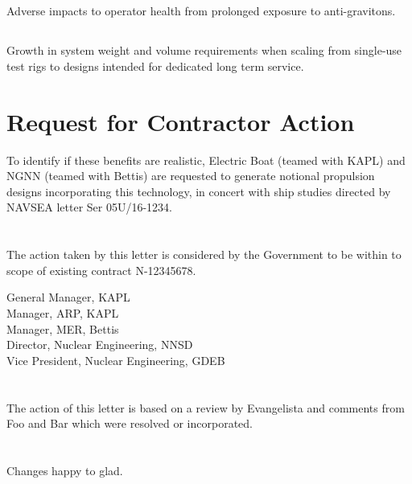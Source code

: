 \documentclass[12pt,courier]{navyletter}
\begin{document}
\subsection{} Adverse impacts to operator health from prolonged exposure to anti-gravitons.

\subsection{} Growth in system weight and volume requirements when scaling from single-use test rigs to designs intended for dedicated long term service. 

\section{Request for Contractor Action} To identify if these benefits are realistic, Electric Boat (teamed with KAPL) and NGNN (teamed with Bettis) are requested to generate notional propulsion designs incorporating this technology, in concert with ship studies directed by NAVSEA letter Ser 05U/16-1234.  

\section{} The action taken by this letter is considered by the Government to be within to scope of existing contract N-12345678. 

\noclosing{}
\signspace{}
\signature{I P Freely}
\bydirection

\copyto
General Manager, KAPL\\
Manager, ARP, KAPL\\
Manager, MER, Bettis\\
Director, Nuclear Engineering, NNSD\\
Vice President, Nuclear Engineering, GDEB\\

\navyrecordnote

%

\navyrecordnotesubjline

\section{}
The action of this letter is based on a review by Evangelista and comments from Foo and Bar which were resolved or incorporated.

\section{}
Changes happy to glad. 
\end{document}
